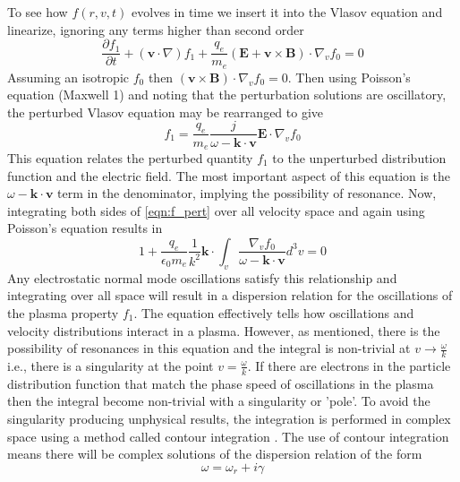 To see how $f(r,v,t)$ evolves in time we insert it into the Vlasov equation and linearize, ignoring any terms higher than second order
\begin{equation}
\frac{\partial f_1}{\partial t} + (\mathbf v\cdot \nabla)f_1 +\frac{q_e}{m_e}(\mathbf{E} + \mathbf{v}\times \mathbf{B})\cdot\nabla_vf_0=0
\end{equation}
Assuming an isotropic $f_0$ then $(\mathbf{v}\times \mathbf{B})\cdot\nabla_vf_0=0$. Then using Poisson's equation (Maxwell 1) and noting that the perturbation solutions are oscillatory, the perturbed Vlasov equation may be rearranged to give
\begin{equation}
f_1=\frac{q_e}{m_e}\frac{j}{\omega-\mathbf{k\cdot v}}\mathbf{E}\cdot\nabla_vf_0
\label{eqn:f_pert}
\end{equation}
This equation relates the perturbed quantity $f_1$ to the unperturbed distribution function and the electric field. The most important aspect of this equation is the $\omega-\mathbf{k\cdot v}$ term in the denominator, implying the possibility of resonance. Now, integrating both sides of \ref{eqn:f_pert} over all velocity space and again using Poisson's equation results in
\begin{equation}
1+\frac{q_e}{\epsilon_0m_e}\frac{1}{k^2}\mathbf{k}\cdot\int_v\frac{\nabla_v f_0}{\omega-\mathbf{k\cdot v}}d^3v=0
\end{equation}
Any electrostatic normal mode oscillations satisfy this relationship and integrating over all space will result in a dispersion relation for the oscillations of the plasma property $f_1$. The equation effectively tells how oscillations and velocity distributions interact in a plasma. However, as mentioned, there is the possibility of resonances in this equation and the integral is non-trivial at $v \rightarrow \frac{\omega}{k}$ i.e., there is a singularity at the point $v = \frac{\omega}{k}$. If there are electrons in the particle distribution function that match the phase speed of oscillations in the plasma then the integral become non-trivial with a singularity or 'pole'. To avoid the singularity producing unphysical results, the integration is performed in complex space using a method called contour integration  \citep{melrose1989}. The use of contour integration means there will be complex solutions of the dispersion relation of the form
\begin{equation}
\omega = \omega_r + i\gamma
\end{equation}
